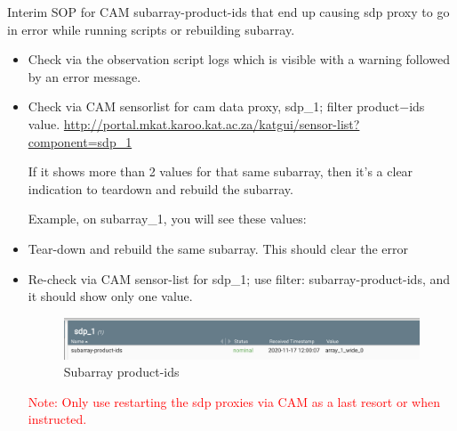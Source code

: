  Interim SOP for CAM subarray-product-ids that end up causing sdp proxy to go in error while running scripts or rebuilding subarray.
\begin{itemize}


 	\item{} Check via the observation script logs which is visible with a warning followed by an error message.

 
	\item{} Check via CAM sensor\-list for cam data proxy, sdp\_1; filter product$-$ids value. 
\url{http://portal.mkat.karoo.kat.ac.za/katgui/sensor-list?component=sdp\_1}

If it shows more than 2 values for that same subarray, then it's a clear indication to teardown and rebuild the subarray.

Example, on subarray\_1, you will see these values: 


\item{} Tear-down and rebuild the same subarray.  This should clear the error
\item{} Re-check via CAM sensor-list for sdp\_1; use filter: subarray-product-ids, and it should show only one value.


\begin{figure}[!thb]
	\centering
	\includegraphics[scale=0.7]{Chapters/images/image43.png}
	
	\caption{Subarray product-ids}
	\label{fig:image43}
\end{figure}

\textcolor{red}{Note: Only use restarting the sdp proxies via CAM as a last resort or when instructed.}
\end{itemize}

